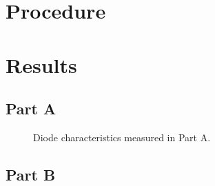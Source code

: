 \documentclass{article}
\begin{document}
\section{Procedure}
\label{sec:procedure}

%
%

\section{Results}
\label{sec:results}

\subsection{Part A}
\label{sec:result_a}

\begin{figure}[hbtp]
  \begin{center}
    
  \end{center}
  \caption{\label{fig:part_a_graph} Diode characteristics measured in Part A.}
\end{figure}

\subsection{Part B}
\label{sec:result_b}
\end{document}
